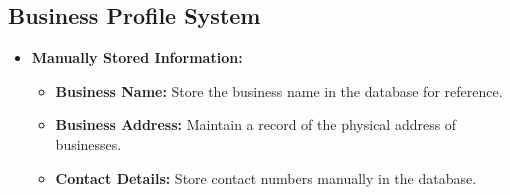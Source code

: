 \subsection{Business Profile System}
\begin{itemize}[leftmargin=*]
    \item \textbf{Manually Stored Information:}
    \begin{itemize}
        \item \textbf{Business Name:} Store the business name in the database for reference.
        \item \textbf{Business Address:} Maintain a record of the physical address of businesses.
        \item \textbf{Contact Details:} Store contact numbers manually in the database.
    \end{itemize}
\end{itemize}

